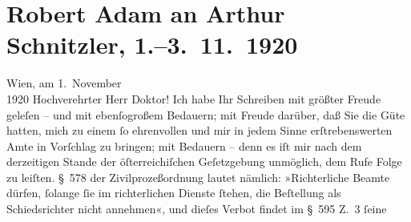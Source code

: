 

         \renewcommand{\erwaehnteInstitutionen}{Institutionen: Deutschösterreichischer Autorenverband, Vereinigung der österreichischen Richterinnen und Richter}
         \renewcommand{\erwaehnteOrte}{Orte: Wien}
         \renewcommand{\erwaehnteWerke}{}
               \section[Robert Adam an Arthur Schnitzler, 1.–3. 11. 1920]{ Robert Adam an Arthur Schnitzler, 1.–3. 11. 1920}\nopagebreak{}\rehead{ }\begin{ledgroupsized}[t]{13cm}\normalsize\beginnumbering \toendnotes[C]{\smallbreak\pagebreak[2]} 
\toendnotes[C]{\smallbreak}\pstart
           \raggedleft{}{\pb}Wien, am 1. November{\\}1920\pend
           \pstart\center{}Hochverehrter Herr Doktor!\pend\pstart
           Ich habe Ihr Schreiben mit größter Freude geleſen – und mit ebenſogroßem Bedauern;
               mit Freude darüber, daß Sie die Güte hatten, mich zu einem ſo ehrenvollen und mir in
               jedem Sinne erſtrebenswerten Amte in Vorſchlag zu bringen; mit Bedauern – denn es iſt
               mir nach dem derzeitigen Stande der öſterreichiſchen Geſetzgebung unmöglich, dem Rufe
               Folge zu leiſten. § 578 der Zivilprozeßordnung lautet nämlich: »Richterliche Beamte
               dürfen, ſolange ſie im richterlichen Dienste ſtehen, die Beſtellung als
               Schiedsrichter nicht annehmen«, und dieſes Verbot findet im § 595 Z. 3 ſeine

\end{ledgroupsized}
